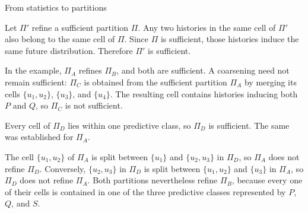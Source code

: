 \begin{exercise}[Core]{From statistics to partitions}
\begin{solution}
\begin{parts}
      \item Let $\Pi'$ refine a sufficient partition $\Pi$. Any two histories
        in the same cell of $\Pi'$ also belong to the same cell of $\Pi$.
        Since $\Pi$ is sufficient, those histories induce the same future
        distribution. Therefore $\Pi'$ is sufficient.

        In the example, $\Pi_A$ refines $\Pi_B$, and both are sufficient. A
        coarsening need not remain sufficient: $\Pi_C$ is obtained from the
        sufficient partition $\Pi_A$ by merging its cells
        $\{u_1,u_2\}$, $\{u_3\}$, and $\{u_4\}$. The resulting cell contains
        histories inducing both $P$ and $Q$, so $\Pi_C$ is not sufficient.

      \item Every cell of $\Pi_D$ lies within one predictive class, so $\Pi_D$
        is sufficient. The same was established for $\Pi_A$.

        The cell $\{u_1,u_2\}$ of $\Pi_A$ is split between $\{u_1\}$ and
        $\{u_2,u_3\}$ in $\Pi_D$, so $\Pi_A$ does not refine $\Pi_D$.
        Conversely, $\{u_2,u_3\}$ in $\Pi_D$ is split between
        $\{u_1,u_2\}$ and $\{u_3\}$ in $\Pi_A$, so $\Pi_D$ does not refine
        $\Pi_A$. Both partitions nevertheless refine $\Pi_B$, because every
        one of their cells is contained in one of the three predictive classes
        represented by $P$, $Q$, and $S$.
    \end{parts}
  \end{solution}
\end{exercise}

